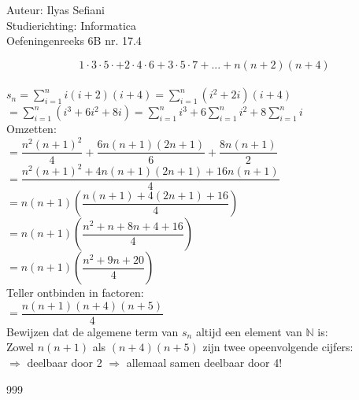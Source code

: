 \documentclass[a4paper]{article}
\begin{document}
\noindent \large Auteur: Ilyas Sefiani \\
\noindent \large Studierichting: Informatica\\
\noindent \large Oefeningenreeks 6B nr. 17.4\\

\medskip

\normalsize

$$1 \cdot 3 \cdot 5 \cdot + 2 \cdot 4 \cdot 6 + 3 \cdot 5 \cdot 7 + ... + n(n+2)(n+4)$$\\ 

$s_{n}=\displaystyle\sum\limits_{i=1}^{n} i(i+2)(i+4)= \displaystyle\sum\limits_{i=1}^{n} (i^2+2i)(i+4)$\\

$=\displaystyle\sum\limits_{i=1}^{n} (i^3 +6i^2 +8i) = \displaystyle\sum\limits_{i=1}^{n} i^3 + 6\displaystyle\sum\limits_{i=1}^{n}i^2 +8\displaystyle\sum\limits_{i=1}^{n}i$\\

Omzetten:\\

$= \dfrac{n^2(n+1)^2}{4} + \dfrac{6n(n+1)(2n+1)}{6} + \dfrac{8n(n+1)}{2}$\\

$= \dfrac{n^2(n+1)^2 + 4n(n+1)(2n+1) + 16n(n+1)}{4}$\\

$= n(n+1)\left(\dfrac{n(n+1) + 4(2n+1) + 16}{4}\right)$\\

$= n(n+1)\left(\dfrac{n^2+n + 8n+4 + 16}{4}\right)$\\

$= n(n+1)\left(\dfrac{n^2 + 9n +20}{4}\right)$\\

Teller ontbinden in factoren:\\

$= \dfrac{n(n+1)(n+4)(n+5)}{4}$\\

Bewijzen dat de algemene term van $s_{n}$ altijd een element van $\mathbb{N}$ is:\\

Zowel $n(n+1)$ als $(n+4)(n+5)$ zijn twee opeenvolgende cijfers:\\

$\Rightarrow$ deelbaar door 2 $\Rightarrow$ allemaal samen deelbaar door 4!\\

\begin{thebibliography}{999}
\end{thebibliography}
\end{document}
